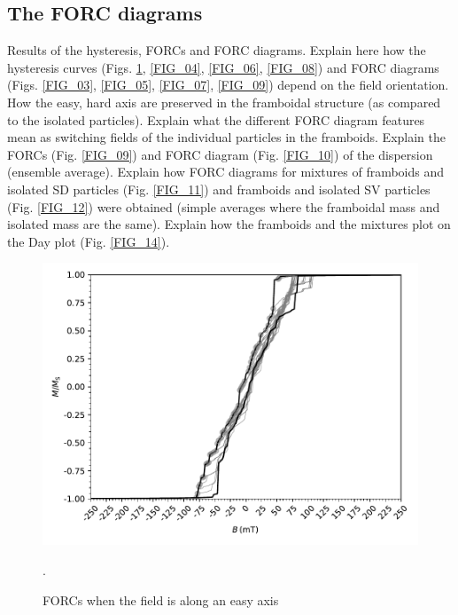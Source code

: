 \subsection{The FORC diagrams}
Results of the hysteresis, FORCs and FORC diagrams. Explain here how the hysteresis curves (Figs. \ref{FIG_02}, \ref{FIG_04}, \ref{FIG_06}, \ref{FIG_08}) and FORC diagrams (Figs. \ref{FIG_03}, \ref{FIG_05}, \ref{FIG_07}, \ref{FIG_09}) depend on the field orientation. How the easy, hard axis are preserved in the framboidal structure (as compared to the isolated particles). Explain what the different FORC diagram features mean as switching fields of the individual particles in the framboids. Explain the FORCs (Fig. \ref{FIG_09}) and FORC diagram (Fig. \ref{FIG_10}) of the dispersion (ensemble average). Explain how FORC diagrams for mixtures of framboids and isolated SD particles (Fig. \ref{FIG_11}) and framboids and isolated SV particles (Fig. \ref{FIG_12}) were obtained (simple averages where the framboidal mass and isolated mass are the same). Explain how the framboids and the mixtures plot on the Day plot (Fig. \ref{FIG_14}).\par
\begin{figure}
\centering
\includegraphics[width=\textwidth]{research-4/figs/BM21_withFORCS.pdf}
\caption[FORCs when the field is along an easy axis]{FORCs when the field is along an easy axis}.
\label{FIG_02}
\end{figure}


